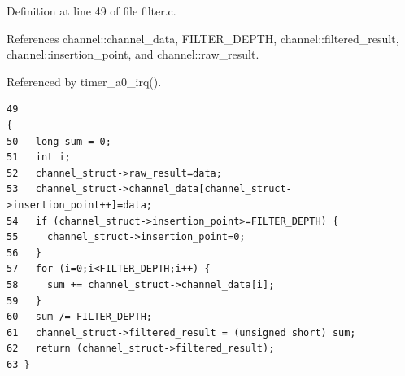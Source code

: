 Definition at line 49 of file filter.c.

References channel::channel\_\-data, FILTER\_\-DEPTH, channel::filtered\_\-result, channel::insertion\_\-point, and channel::raw\_\-result.

Referenced by timer\_\-a0\_\-irq().

\footnotesize\begin{verbatim}49                                                                                 {
50   long sum = 0;
51   int i;
52   channel_struct->raw_result=data;
53   channel_struct->channel_data[channel_struct->insertion_point++]=data;
54   if (channel_struct->insertion_point>=FILTER_DEPTH) {
55     channel_struct->insertion_point=0;
56   }
57   for (i=0;i<FILTER_DEPTH;i++) {
58     sum += channel_struct->channel_data[i];
59   }
60   sum /= FILTER_DEPTH;
61   channel_struct->filtered_result = (unsigned short) sum;
62   return (channel_struct->filtered_result);
63 }
\end{verbatim}\normalsize 


